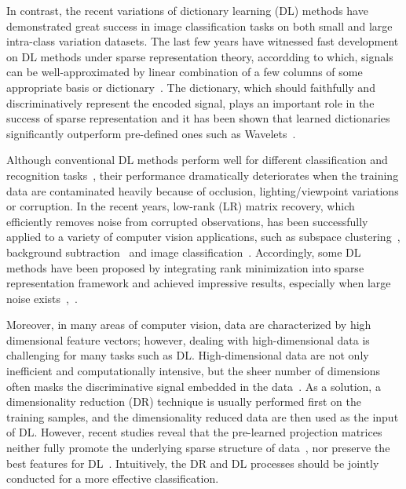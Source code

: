 \documentclass[journal]{IEEEtran}
\begin{document}
In contrast, the recent variations of dictionary learning (DL) methods have demonstrated great success in image classification tasks on both small and large intra-class variation datasets. The last few years have witnessed fast development on DL methods under sparse representation theory, accordding to which, signals can be well-approximated by linear combination of a few columns of some appropriate basis or dictionary~\cite{SRC}. The dictionary, which should faithfully and discriminatively represent the encoded signal, plays an important role in the success of sparse representation and it has been shown that learned dictionaries significantly outperform pre-defined ones such as Wavelets~\cite{FDDL}. 

Although conventional DL methods perform well for different classification and recognition tasks~\cite{FDDL}, their performance dramatically deteriorates when the training data are contaminated heavily because of occlusion, lighting/viewpoint variations or corruption. In the recent years, low-rank (LR) matrix recovery, which efficiently removes noise from corrupted observations, has been successfully applied to a variety of computer vision applications, such as subspace clustering~\cite{LR-Subspace}, background subtraction~\cite{BS-LR} and image classification~\cite{BMVC-Homa}. Accordingly, some DL methods have been proposed by integrating rank minimization into sparse representation framework and achieved impressive results, especially when large noise exists~\cite{D2L2R2},~\cite{Structured-LR-DL}. 

Moreover, in many areas of computer vision, data are characterized by high dimensional feature vectors; however, dealing with high-dimensional data is challenging for many tasks such as DL. High-dimensional data are not only inefficient and computationally intensive, but the sheer number of dimensions often masks the discriminative signal embedded in the data~\cite{LGE-KSVD}. As a solution, a dimensionality reduction (DR) technique is usually performed first on the training samples, and the dimensionality reduced data are then used as the input of DL. However, recent studies reveal that the pre-learned projection matrices neither fully promote the underlying sparse structure of data~\cite{SE}, nor preserve the best features for DL~\cite{JDDRDL}. Intuitively, the DR and DL processes should be jointly conducted for a more effective classification. 
\end{document}
